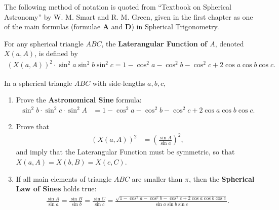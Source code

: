 \begin{tcolorbox}[title={The Sine Formulae (from ``Spherical Astronomy'')}]
The following method of notation is quoted from ``Textbook on Spherical Astronomy'' by W. M. Smart and R. M. Green, given in the first chapter as one of the main formulas (formulae \textbf{A} and \textbf{D}) in Spherical Trigonometry.%
    \begin{definition}
    For any spherical triangle $ABC$, the \textbf{Laterangular Function of $A$}, denoted $X(a,A)$, is defined by
        \begin{align*}
            \left(X(a,A)\right)^2\cdot \sin^2 a \sin^2 b \sin^2 c = 1- \cos^2 a -\cos^2 b -\cos^2 c + 2\cos a \cos b \cos c.
        \end{align*}
    \end{definition}
    \begin{question}
    In a spherical triangle $ABC$ with side-lengths $a,b,c$,
            \begin{enumerate}
            \item  Prove the \textbf{Astronomical Sine} formula:
            \begin{align*}
                \sin^2 b \cdot \sin^2 c \cdot \sin^2 A &= 1- \cos^2 a -\cos^2 b - \cos^2 c + 2\cos a \cos b \cos c.
            \end{align*}
            \item Prove that
            \begin{align*}
                \left(X(a,A)\right)^2 &= \left(\frac{\sin A}{\sin a}\right)^2,
            \end{align*}
            and imply that the Laterangular Function must be symmetric, so that $X(a,A) = X(b,B) = X(c,C)$.
            \item If all main elements of triangle $ABC$ are smaller than $\pi$, then the \textbf{Spherical Law of Sines} holds true:
            \begin{align*}
                \frac{\sin A}{\sin a} =  \frac{\sin B}{\sin b} = \frac{\sin C}{\sin c} = \frac{\sqrt{ 1- \cos^2 a -\cos^2 b - \cos^2 c + 2\cos a \cos b \cos c}}{\sin a \sin b \sin c}.
            \end{align*}
            \end{enumerate}
    \end{question}
    \begin{definition}

\end{definition}
\end{tcolorbox}
